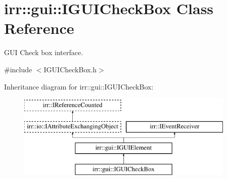 \hypertarget{classirr_1_1gui_1_1IGUICheckBox}{}\section{irr\+:\+:gui\+:\+:I\+G\+U\+I\+Check\+Box Class Reference}
\label{classirr_1_1gui_1_1IGUICheckBox}


G\+UI Check box interface.  




{\ttfamily \#include $<$I\+G\+U\+I\+Check\+Box.\+h$>$}

Inheritance diagram for irr\+:\+:gui\+:\+:I\+G\+U\+I\+Check\+Box\+:\begin{figure}[H]
\begin{center}
\leavevmode
\includegraphics[height=4.000000cm]{classirr_1_1gui_1_1IGUICheckBox}
\end{center}
\end{figure}
